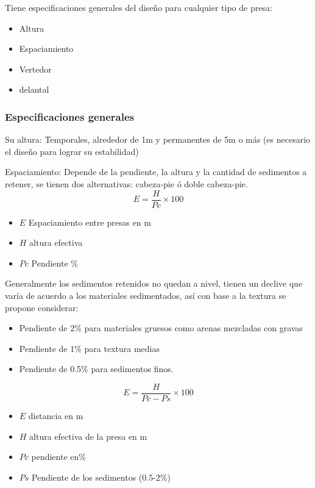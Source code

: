     Tiene especificaciones generales del diseño para cualquier tipo de presa:
    \begin{itemize}
        \item Altura
        \item Espaciamiento 
        \item Vertedor 
        \item delantal
    \end{itemize}
    \subsubsection{Especificaciones generales}
    Su altura: Temporales, alrededor de 1m y permanentes de 5m o más (es necesario el diseño para lograr su estabilidad)
    
    Espaciamiento: Depende de la pendiente, la altura y la cantidad de sedimentos a retener, se tienen dos alternativas: cabeza-pie ó doble cabeza-pie.
    \begin{equation}
        E=\frac{H}{Pc}\times 100
    \end{equation}
    \begin{notation}
    \begin{itemize}
        \item $E$ Espaciamiento entre presas en m
        \item $H$ altura efectiva
        \item $Pc$ Pendiente \%
    \end{itemize}
    \end{notation}
    Generalmente los sedimentos retenidos no quedan a nivel, tienen un declive que varía de acuerdo a los materiales sedimentados, así con base a la textura se propone considerar:
    \begin{itemize}
        \item Pendiente de 2\% para materiales gruesos como arenas mezcladas con gravas
        \item Pendiente de 1\% para textura medias
        \item Pendiente de 0.5\% para sedimentos finos.
    \end{itemize}
    \begin{equation}
        E=\frac{H}{Pc - Ps}\times 100
    \end{equation}
    \begin{notation}
    \begin{itemize}
        \item $E$ distancia en m
        \item $H$ altura efectiva de la presa en m
        \item $Pc$ pendiente en\%
        \item $Ps$ Pendiente de los sedimentos (0.5-2\%)
    \end{itemize}
    \end{notation}
